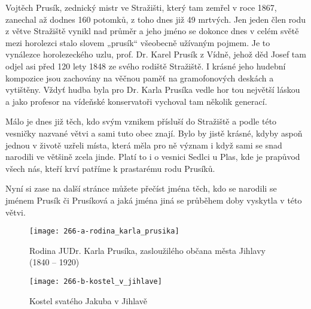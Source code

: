 \documentclass[../dejiny-rodu-prusiku.tex]{subfiles}
\begin{document}
Vojtěch Prusík, zednický mistr ve Stražišti, který tam zemřel v roce 1867, zanechal až dodnes 160 potomků, z toho dnes již 49 mrtvých. Jen jeden člen rodu z větve Stražiště vynikl nad průměr a jeho jméno se dokonce dnes v celém světě mezi horolezci stalo slovem „prusík“ všeobecně užívaným pojmem. Je to vynálezce horolezeckého uzlu, prof. Dr. Karel Prusík z Vídně, jehož děd Josef tam odjel asi před 120 lety 1848 ze svého rodiště Stražiště. I krásné jeho hudební kompozice jsou zachovány na věčnou paměť na gramofonových deskách a vytištěny. Vždyť hudba byla pro Dr. Karla Prusíka vedle hor tou největší láskou a jako profesor na vídeňské konservatoři vychoval tam několik generací.

Málo je dnes již těch, kdo svým vznikem přísluší do Stražiště a podle této vesničky nazvané větvi a sami tuto obec znají. Bylo by jistě krásné, kdyby aspoň jednou v životě uzřeli místa, která měla pro ně význam i když sami se snad narodili ve většině zcela jinde. Platí to i o vesnici Sedlci u Plas, kde je prapůvod všech nás, kteří krví patříme k prastarému rodu Prusíků.

Nyní si zase na další stránce můžete přečíst jména těch, kdo se narodili se jménem Prusík či Prusíková a jaká jména jiná se průběhem doby vyskytla v této větvi.


\begin{figure}
\centering
\texttt{[image: 266-a-rodina\_karla\_prusika]}
\caption{Rodina JUDr. Karla Prusíka, zasloužilého občana města Jihlavy (1840 – 1920)}
\label{fig:266-a-rodina_karla_prusika}
\end{figure}

             \begin{figure}
\centering
\texttt{[image: 266-b-kostel\_v\_jihlave]}
\caption{Kostel svatého Jakuba v Jihlavě}
\label{fig:266-b-kostel_v_jihlave}
\end{figure}
\end{document}
